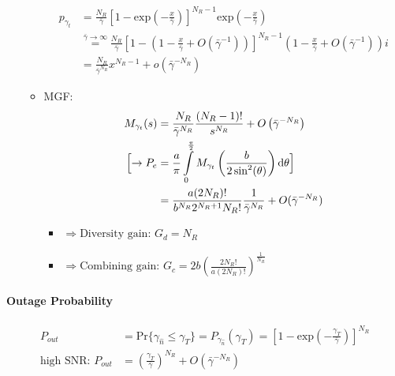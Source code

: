 \documentclass[a4paper, 10pt]{article}
\begin{document}
\begin{itemize}
\begin{itemize}
			\begin{align*}
			p_{\gamma_t}&=\frac{N_R}{\bar{\gamma}}
			\left[1-\mathrm{exp}\left(-\frac{x}{\bar{\gamma}}\right)\right]^{N_R-1}\mathrm{exp}\left(-\frac{x}{\bar{\gamma}}\right)\\
			&\overset{\bar{\gamma} \rightarrow \infty}{=} \frac{N_R}{\bar{\gamma}}
			\left[1-\left(1-\frac{x}{\bar{\gamma}}+O\left(\bar{\gamma}^{-1}\right)\right)\right]^{N_R-1}
			\left(1-\frac{x}{\bar{\gamma}}+O\left(\bar{\gamma}^{-1}\right)\right)i\\
			&=\frac{N_R}{\bar{\gamma}^{N_R}}x^{N_R-1}+o\left(\bar{\gamma}^{-N_R}\right)
			\end{align*}
		\item MGF:
			\begin{align*}
			M_{\gamma_t}(s)&=\frac{N_R}{\bar{\gamma}^{N_R}}\frac{(N_R-1)!}{s^{N_R}}+O\left(\bar{\gamma}^{-N_R}\right)\\
			\Bigl[\rightarrow P_e&=\frac{a}{\pi}\int\limits^{\frac{\pi}{2}}_0 M_{\gamma_t}\left(\frac{b}{2\sin^2(\theta)}\right)\mathrm{d}\theta\Bigr]\\
			&=\frac{a(2N_R)!}{b^{N_R}2^{N_R+1}N_R!}\frac{1}{\bar{\gamma}^{N_R}}+O(\bar{\gamma}^{-N_R})
			\end{align*}
		\begin{itemize}
			\item[] $\Longrightarrow \text{Diversity gain: } G_d = N_R$
			\item[] $\Longrightarrow \text{Combining gain: } G_c = 2b\left(\frac{2N_R!}{a(2N_R)!}\right)^{\frac{1}{N_R}}$
		\end{itemize}
	\end{itemize}
\end{itemize}
\paragraph{Outage Probability}
		\begin{align*}
			P_{out}&=\mathrm{Pr}\{\gamma_{\hat{n}} \leq \gamma_T \}=P_{\gamma_{\hat{n}}}(\gamma_T)=\left[1-\mathrm{exp}\left(-\frac{\gamma_T}{\bar{\gamma}}\right)\right]^{N_R}\\
			\text{high SNR: } P_{out}&=\left(\frac{\gamma_T}{\bar{\gamma}}\right)^{N_R}+O\left(\bar{\gamma}^{-N_R}\right)
		\end{align*}
\end{document}
